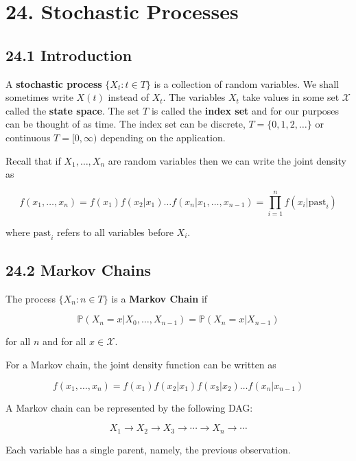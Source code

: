 \section*{24. Stochastic Processes}\label{stochastic-processes}

\subsection*{24.1 Introduction}\label{introduction}

A \textbf{stochastic process} \(\{ X_t : t \in T \}\) is a collection of
random variables. We shall sometimes write \(X(t)\) instead of \(X_t\).
The variables \(X_t\) take values in some set \(\mathcal{X}\) called the
\textbf{state space}. The set \(T\) is called the \textbf{index set} and
for our purposes can be thought of as time. The index set can be
discrete, \(T = \{0, 1, 2, \dots \}\) or continuous \(T = [0, \infty)\)
depending on the application.

Recall that if \(X_{1}, \dots, X_{n}\) are random variables then we can
write the joint density as

\[ f(x_{1}, \dots, x_{n}) = f(x_{1}) f(x_{2} | x_{1}) \dots f(x_{n} | x_{1}, \dots, x_{n-1}) = \prod_{i=1}^{n} f(x_{i} | \text{past}_{i}) \]

where \(\text{past}_{i}\) refers to all variables before \(X_{i}\).

\subsection*{24.2 Markov Chains}\label{markov-chains}

The process \(\{ X_{n} : n \in T \}\) is a \textbf{Markov Chain} if

\[ \mathbb{P}(X_{n} = x | X_{0}, \dots, X_{n-1}) = \mathbb{P}(X_{n} = x | X_{n-1})\]

for all \(n\) and for all \(x \in \mathcal{X}\).

For a Markov chain, the joint density function can be written as

\[ f(x_{1}, \dots, x_{n}) = f(x_{1}) f(x_{2} | x_{1}) f(x_{3} | x_{2}) \dots f(x_{n} | x_{n - 1}) \]

A Markov chain can be represented by the following DAG:

\[ X_{1} \longrightarrow X_{2} \longrightarrow X_{3} \longrightarrow \cdots \longrightarrow X_{n} \longrightarrow \cdots \]

Each variable has a single parent, namely, the previous observation.

